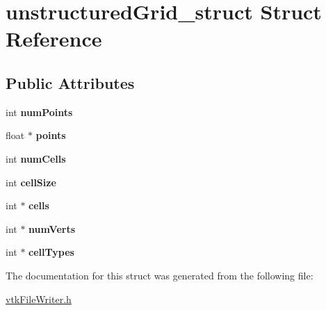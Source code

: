 \hypertarget{structunstructuredGrid__struct}{
\section{unstructuredGrid\_\-struct Struct Reference}
\label{structunstructuredGrid__struct}
}
\subsection*{Public Attributes}
\begin{DoxyCompactItemize}
\item 
\hypertarget{structunstructuredGrid__struct_aa76335584491c046993b8974fb16d15a}{
int {\bfseries numPoints}}
\label{structunstructuredGrid__struct_aa76335584491c046993b8974fb16d15a}

\item 
\hypertarget{structunstructuredGrid__struct_a0be84464c8caa495af929aee64a66c8e}{
float $\ast$ {\bfseries points}}
\label{structunstructuredGrid__struct_a0be84464c8caa495af929aee64a66c8e}

\item 
\hypertarget{structunstructuredGrid__struct_a04fe36937256345786eac90bcfbaf760}{
int {\bfseries numCells}}
\label{structunstructuredGrid__struct_a04fe36937256345786eac90bcfbaf760}

\item 
\hypertarget{structunstructuredGrid__struct_a6c63ce435f373bf13a82ad606aed1e42}{
int {\bfseries cellSize}}
\label{structunstructuredGrid__struct_a6c63ce435f373bf13a82ad606aed1e42}

\item 
\hypertarget{structunstructuredGrid__struct_a5f3ed8a8897202f1d1dfbf99d12e0524}{
int $\ast$ {\bfseries cells}}
\label{structunstructuredGrid__struct_a5f3ed8a8897202f1d1dfbf99d12e0524}

\item 
\hypertarget{structunstructuredGrid__struct_aba0b9ad2b1849a0c3660bfd7f910366b}{
int $\ast$ {\bfseries numVerts}}
\label{structunstructuredGrid__struct_aba0b9ad2b1849a0c3660bfd7f910366b}

\item 
\hypertarget{structunstructuredGrid__struct_a354975f94f95f2cbcb7f019a9661f2b8}{
int $\ast$ {\bfseries cellTypes}}
\label{structunstructuredGrid__struct_a354975f94f95f2cbcb7f019a9661f2b8}

\end{DoxyCompactItemize}


The documentation for this struct was generated from the following file:\begin{DoxyCompactItemize}
\item 
\hyperlink{vtkFileWriter_8h}{vtkFileWriter.h}\end{DoxyCompactItemize}

